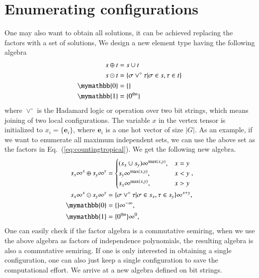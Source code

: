 \documentclass[review,onefignum,onetabnum]{siamart190516}
\newcommand{\<}{\langle}
\renewcommand{\>}{\rangle}
\newcommand{\Eq}[1]{Eq.~(\ref{#1})}
\newcounter{example}
\begin{document}
\section{Enumerating configurations}
One may also want to obtain all solutions, it can be achieved replacing the factors with a set of solutions,
We design a new element type having the following algebra
\begin{align}
\begin{split}
    s \oplus t &= s \cup t\\
    s \odot t &= \{\sigma \lor^\circ \tau | \sigma \in s, \tau \in t\}\\
    \mymathbb{0} &= \{\}\\
    \mymathbb{1} &= \{0^{\otimes n}\}
\end{split}\label{eq:set}
\end{align}
where $\lor^\circ$ is the Hadamard logic or operation over two bit strings, which means joining of two local configurations.
The variable $x$ in the vertex tensor is initialized to $x_i = \{\boldsymbol{e}_{i}\}$,
where $\boldsymbol{e}_i$ is a one hot vector of size $|G|$.
As an example, if we want to enumerate all maximum independent sets, we can use the above set as the factors in \Eq{eq:countingtropical}.
We get the following new algebra.
\begin{align}
\begin{split}
    s_x\infty^x \oplus s_y\infty^y &= \begin{cases}
        (s_x \cup s_y)\infty^{\max(x,y)}, & x = y\\
        s_y\infty^{\max(x,y)}, & x < y\\
        s_x\infty^{\max(x,y)}, & x > y
    \end{cases},\\
    s_x\infty^x \odot s_y\infty^y &= \{\sigma \lor^\circ \tau | \sigma \in s_x, \tau \in s_y\}\infty^{x+y},\\
    \mymathbb{0} &= \{\}\infty^{-\infty},\\
    \mymathbb{1} &= \{0^{\otimes n}\}\infty^{0},
\end{split}
\end{align}
One can easily check if the factor algebra is a commutative semiring,
when we use the above algebra as factors of independence polynomials, the resulting algebra is also a commutative semiring.
If one is only interested in obtaining a single configuration, one can also just keep a single configuration to save the computational effort.
We arrive at a new algebra defined on bit strings.
\end{document}
